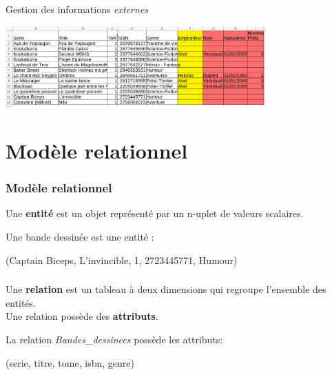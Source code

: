 \documentclass[svgnames,11pt]{beamer}
\begin{document}
\begin{frame}
    \frametitle{}

    \begin{center}
        {\Large Gestion des informations \emph{externes}}
    \end{center}
    \begin{center}
        \includegraphics[width=10cm]{ressources/approche-12.png}
    \end{center}
\end{frame}
\section{Modèle relationnel}
\begin{frame}
    \frametitle{Modèle relationnel}

    \begin{aretenir}[]
        Une \textbf{entité} est un objet représenté par un n-uplet de valeurs scalaires.
    \end{aretenir}
    Une bande dessinée est une entité :
    \begin{center}
        (Captain Biceps, L’invincible, 1, 2723445771, Humour)
    \end{center}
\end{frame}
\begin{frame}
    \frametitle{}

    \begin{aretenir}[]
        Une \textbf{relation} est un tableau à deux dimensions qui regroupe l'ensemble des entités.\\    Une relation possède des \textbf{attributs}.

    \end{aretenir}
    La relation \emph{Bandes\_dessinees} possède les attributs:
    \begin{center}
        (serie, titre, tome, isbn, genre)
    \end{center}
\end{frame}
\end{document}
